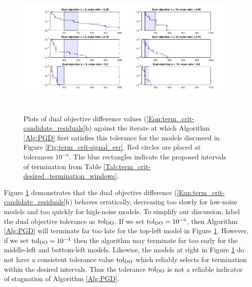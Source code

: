 \begin{figure}[H]
\centering
\hbox{\hspace{-2.1cm} \includegraphics[scale=0.6]{term_crit-dual_obj} }\vspace{-0.4cm}
\caption{Plots of dual objective difference values (\ref{Eqn:term_crit-candidate_residuals}h) against the iterate at which Algorithm \ref{Alg:PGD} first satisfies this tolerance for the models discussed in Figure \ref{Fig:term_crit-signal_err}.  Red circles are placed at tolerances $10^{-n}$.  The blue rectangles indicate the proposed intervals of termination from Table \ref{Tab:term_crit-desired_termination_windows}.}
\label{Fig:term_crit-dual_obj}
\end{figure}


Figure \ref{Fig:term_crit-dual_obj} demonstrates that the dual objective difference (\ref{Eqn:term_crit-candidate_residuals}h) behaves erratically, decreasing too slowly for low-noise models and too quickly for high-noise models.  To simplify our discussion, label the dual objective tolerance as $\textnormal{tol}_\text{DO}$.  If we set $\textnormal{tol}_\text{DO} = 10^{-5}$, then Algorithm \ref{Alg:PGD} will terminate far too late for the top-left model in Figure \ref{Fig:term_crit-dual_obj}.  However, if we set $\textnormal{tol}_\text{DO} = 10^{-4}$ then the algorithm may terminate far too early for the middle-left and bottom-left models.  Likewise, the models at right in Figure \ref{Fig:term_crit-dual_obj} do not have a consistent tolerance value $\textnormal{tol}_\text{DO}$ which reliably selects for termination within the desired intervals.  Thus the tolerance $\textnormal{tol}_\text{DO}$ is not a reliable indicator of stagnation of Algorithm \ref{Alg:PGD}.  



